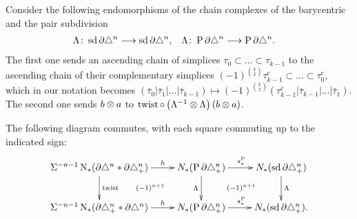 Consider the following endomorphisms of the chain complexes of the barycentric and the pair subdivision
\begin{align*}
	\Lambda \colon \operatorname{sd} \partial\triangle^n& \longrightarrow \operatorname{sd} \partial\triangle^n,
	&
	\Lambda \colon \operatorname{P} \partial\triangle^n& \longrightarrow \operatorname{P} \partial\triangle^n.
\end{align*}
The first one sends an ascending chain of simplices $\tau_0 \subset \dots \subset \tau_{k-1}$ to the ascending chain of their complementary simplices $(-1)^{\binom{k}{2}} \tau_{k-1}^c \subset \dots\subset\tau_0^c$, which in our notation becomes $(\bar{\tau}_0|\bar{\tau}_1|\dots|\bar{\tau}_{k-1})\mapsto (-1)^{\binom{k}{2}}(\tau_{k-1}^c|\bar{\tau}_{k-1}|\dots|\bar{\tau}_1)$. The second one sends $b \otimes a$ to $\operatorname{twist}\circ \left(\Lambda^{-1} \otimes \Lambda\right)(b \otimes a)$.
\begin{lemma} The following diagram commutes, with each square commuting up to the indicated sign:
	\begin{equation}\label{diag:newdiag}
		\xymatrix{
			\susp{-n-1}\chains(\partial \simplex^n*\partial\asimplex^n)\ar[r]^-h\ar[d]^{\twist} \ar@{}[dr] | {(-1)^{n+1}}&\cadenas(\Psd \partial \asimplex^n) \ar[r]^{s_*^{\Psd}}\ar[d]_{\alex} \ar@{}[dr] | {(-1)^{n+1}}& \cadenas(\sd \partial \asimplex^n)\ar[d]^{\alex}\\
			\susp{-n-1}\chains(\partial \asimplex^n*\partial\simplex^n)\ar[r]^-h &\cadenas(\Psd \partial \asimplex^n) \ar[r]^{s_*^{\Psd}}& \cadenas(\sd \partial \asimplex^n).
		}
	\end{equation}
\end{lemma}

